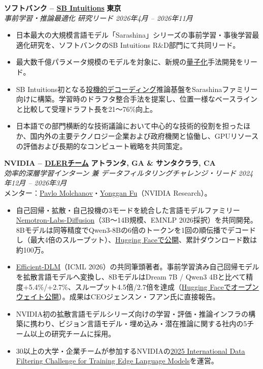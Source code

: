 \documentclass[10pt,a4paper]{article}
\newcommand{\cvlink}[2]{\href{#1}{#2}}
\newcommand{\entry}[4]{%
  \noindent\textbf{#1} \hfill \textbf{#2}\\
  \textit{#3} \hfill \textit{#4}%
}
\begin{document}
\smallskip
\entry{ソフトバンク -- \cvlink{https://www.sbintuitions.co.jp/}{SB Intuitions}}{東京}{事前学習・推論最適化 研究リード}{2026年4月 -- 2026年11月}
\begin{itemize}[leftmargin=*, nosep, itemsep=2pt, topsep=2pt]
  \item 日本最大の大規模言語モデル「Sarashina」シリーズの事前学習・事後学習最適化研究を、ソフトバンクのSB Intuitions R\&D部門にて共同リード。
  \item 最大数千億パラメータ規模のモデルを対象に、新規の\cvlink{https://arxiv.org/pdf/2609.08135}{量子化}手法開発をリード。
  \item SB Intuitions初となる\cvlink{https://arxiv.org/pdf/2606.11552}{投機的デコーディング}推論基盤をSarashinaファミリー向けに構築。学習時のドラフタ整合手法を提案し、位置一様なベースラインと比較して受理ドラフト長を21〜76\%向上。
  \item 日本語での部門横断的な技術議論において中心的な技術的役割を担ったほか、国内外の主要テクノロジー企業および政府機関と協働し、GPUリソースの評価および長期的なコンピュート戦略を共同策定。
\end{itemize}

\smallskip
\entry{NVIDIA -- \cvlink{https://nv-dler.github.io/}{DLERチーム}}{アトランタ, GA \& サンタクララ, CA}{効率的深層学習インターン 兼 データフィルタリングチャレンジ・リード}{2024年12月 -- 2026年3月}\\
{\footnotesize メンター：\cvlink{https://pmolchanov.com/}{Pavlo Molchanov}・\cvlink{https://www.yongganfu.com/}{Yonggan Fu}（NVIDIA Research）。}
\begin{itemize}[leftmargin=*, nosep, itemsep=2pt, topsep=2pt]
  \item 自己回帰・拡散・自己投機の3モードを統合した言語モデルファミリー \cvlink{https://arxiv.org/pdf/2607.05722}{Nemotron-Labs-Diffusion}（3B〜14B規模、EMNLP 2026採択）を共同開発。8Bモデルは同等精度でQwen3-8Bの6倍のトークンを1回の順伝播でデコードし（最大4倍のスループット）、\cvlink{https://huggingface.co/collections/nvidia/nemotron-labs-diffusion}{Hugging Faceで公開}、累計ダウンロード数は約100万。
  \item \cvlink{https://arxiv.org/pdf/2512.14067}{Efficient-DLM}（ICML 2026）の共同筆頭著者。事前学習済み自己回帰モデルを拡散言語モデルへ変換し、8BモデルはDream 7B / Qwen3 4Bと比べて精度+5.4\%/+2.7\%、スループット4.5倍/2.7倍を達成（\cvlink{https://huggingface.co/collections/nvidia/efficient-dlm}{Hugging Faceでオープンウェイト公開}）。成果はCEOジェンスン・フアン氏に直接報告。
  \item NVIDIA初の拡散言語モデルシリーズ向けの学習・評価・推論インフラの構築に携わり、ビジョン言語モデル・埋め込み・潜在推論に関する社内の5チーム以上の研究チームに採用。
  \item 30以上の大学・企業チームが参加するNVIDIAの\href{https://sites.google.com/view/datafilteringchallenge/home}{2025 International Data Filtering Challenge for Training Edge Language Models}を運営。
\end{itemize}
\end{document}
